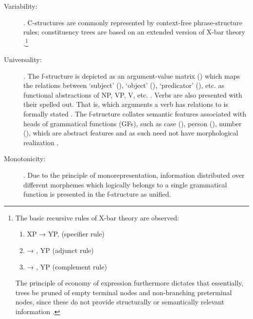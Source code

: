 \begin{description}
\item[Variability:] . 
C-structures are commonly represented by context-free phrase-structure rules; 
constituency trees are based on an extended version of X-bar theory 
\citep[42]{bresnan2016}.\footnote{The basic recursive rules of X-bar theory 
are observed:
\begin{enumerate}[nosep, leftmargin={2\footnotemargin}]
\item XP → YP,  (specifier rule)
\item {} → , YP (adjunct rule)
\item {} → , YP (complement rule)
\end{enumerate}

The principle of economy of expression furthermore dictates that essentially, 
trees be pruned of empty terminal nodes and non-branching preterminal nodes, 
since these do not provide structurally or semantically relevant information 
\citep[119--128]{bresnan2016}.}

\item[Universality:] . The f-structure is depicted
as an argument-value matrix (\Avm{}) which maps the relations between `subject'
(\Sbj{}), `object' (\Obj{}), `predicator' (\Pred{}), etc. as functional
abstractions of NP, VP, V, etc. \citep[42]{bresnan2016}. Verbs are also
presented with their  spelled out. That is, which arguments a
verb has relations to is formally stated \citep[15]{bresnan2016}. The
f-structure collates semantic features associated with heads of grammatical
functions (GFs), such as case (\Case{}), person (\Pers{}), number (\Num{}),
which are abstract features and as such need not have morphological realization
\citep[43]{bresnan2016}.

\item[Monotonicity:] . Due to the principle of monorepresentation, information
distributed over different morphemes which logically belongs to a single
grammatical function is presented in the f-structure as unified.

\end{description}

